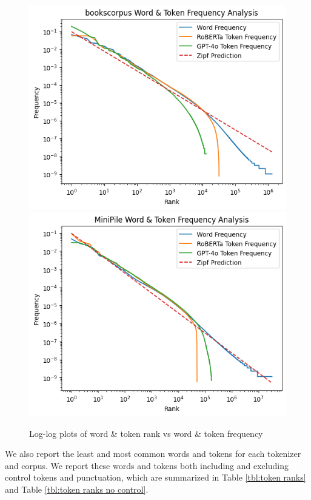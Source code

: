 \documentclass[11pt]{article}
\begin{document}
\begin{figure}[t]
  \includegraphics[width=\columnwidth]{../visualizations/bookscorpusfreq.png}
  \includegraphics[width=\columnwidth]{../visualizations/minipilecorpusfreq.png}
  \caption{Log-log plots of word \& token rank vs word \& token frequency}
  \label{fig:experiments}
\end{figure}

We also report the least and most common words and tokens for each tokenizer and corpus. We report these words and tokens both including and excluding control tokens and punctuation, which are summarized in Table \ref{tbl:token ranks} and Table \ref{tbl:token ranks no control}.
\end{document}
